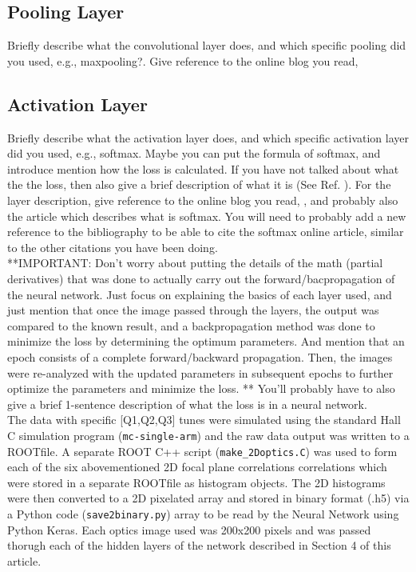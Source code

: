 \documentclass[conference]{IEEEtran}
\begin{document}
\subsection{Pooling Layer}
Briefly describe what the convolutional layer does, and which specific pooling did you used, e.g., maxpooling?. Give reference to the online blog you read, \cite{CNNPart1_VZ_2019}
\subsection{Activation Layer}
Briefly describe what the activation layer does, and which specific activation layer did you used, e.g., softmax. Maybe you can put the formula of softmax, and introduce mention how the loss is calculated. If you have not
talked about what the the loss, then also give a brief description of what it is (See Ref. \cite{}). For the layer description, give reference to the online blog you read, \cite{CNNPart1_VZ_2019}, and probably also
the article which describes what is softmax. You will need to probably add a new reference to the bibliography to be able to cite the softmax online article, similar to the other citations you have been doing.\\

**IMPORTANT:  Don't worry about putting the details of the math (partial derivatives) that was done to actually carry out the forward/bacpropagation of the neural network.
Just focus on explaining the basics of each layer used, and just mention that once the image passed through the layers, the output was compared to the known result, and
a backpropagation method was done to minimize the loss by determining the optimum parameters. And mention that an epoch consists of a complete forward/backward propagation.
Then, the images were re-analyzed with the updated parameters in subsequent epochs to further optimize the parameters and minimize the loss.  ** You'll probably have to also
give a brief 1-sentence description of what the loss is in a neural network.\\
\indent The data with specific [Q1,Q2,Q3] tunes were simulated using the standard Hall C simulation program (\texttt{mc-single-arm})
and the raw data output was written to a ROOTfile. A separate ROOT C++ script (\texttt{make\_2Doptics.C}) was used to form each of
the six abovementioned 2D focal plane correlations correlations which were stored in a separate ROOTfile as histogram objects.
The 2D histograms were then converted to a 2D pixelated array and stored in binary format (.h5) via a Python code (\texttt{save2binary.py})
array to be read by the Neural Network using Python Keras. Each optics image used was 200x200 pixels and was passed thorugh each of
the hidden layers of the network described in Section 4 of this article.
\end{document}
